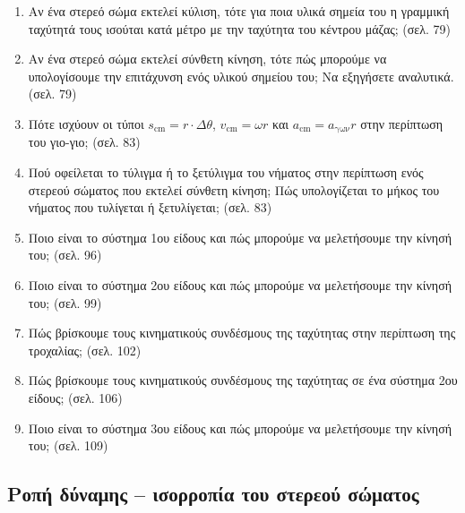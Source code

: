 \documentclass{article}
\begin{document}
\begin{enumerate}
      \item Αν ένα στερεό σώμα εκτελεί κύλιση, τότε για ποια υλικά σημεία του η γραμμική ταχύτητά τους ισούται κατά μέτρο με την ταχύτητα του κέντρου μάζας; (σελ. 79)
      \item Αν ένα στερεό σώμα εκτελεί σύνθετη κίνηση, τότε πώς μπορούμε να υπολογίσουμε την επιτάχυνση ενός υλικού σημείου του; Να εξηγήσετε αναλυτικά. (σελ. 79)
      \item Πότε ισχύουν οι τύποι $s_{\text{cm}} = r \cdot \Delta\theta$, $v_{\text{cm}} = \omega r$ και $a_{\text{cm}} = a_{\text{γων}} r$ στην περίπτωση του γιο-γιο; (σελ. 83)
      \item Πού οφείλεται το τύλιγμα ή το ξετύλιγμα του νήματος στην περίπτωση ενός στερεού σώματος που εκτελεί σύνθετη κίνηση; Πώς υπολογίζεται το μήκος του νήματος που τυλίγεται ή ξετυλίγεται; (σελ. 83)
      \item Ποιο είναι το σύστημα 1ου είδους και πώς μπορούμε να μελετήσουμε την κίνησή του; (σελ. 96)
      \item Ποιο είναι το σύστημα 2ου είδους και πώς μπορούμε να μελετήσουμε την κίνησή του; (σελ. 99)
      \item Πώς βρίσκουμε τους κινηματικούς συνδέσμους της ταχύτητας στην περίπτωση της τροχαλίας; (σελ. 102)
      \item Πώς βρίσκουμε τους κινηματικούς συνδέσμους της ταχύτητας σε ένα σύστημα 2ου είδους; (σελ. 106)
      \item Ποιο είναι το σύστημα 3ου είδους και πώς μπορούμε να μελετήσουμε την κίνησή του; (σελ. 109)
\end{enumerate}

\subsection{Ροπή δύναμης -- ισορροπία του στερεού σώματος}
\end{document}
